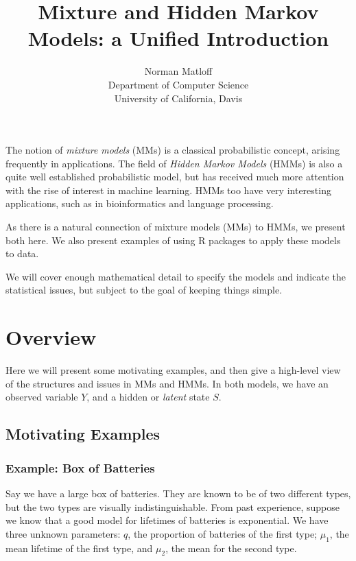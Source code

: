 \documentclass[11pt]{article}
\begin{document}
 

\title{Mixture and Hidden Markov Models: a Unified Introduction}
\author{Norman Matloff \\  
   Department of Computer Science \\
   University of California, Davis}

\maketitle

The notion of \textit{mixture models} (MMs)  is a classical
probabilistic concept, arising frequently in applications.  The field
of \textit{Hidden Markov Models} (HMMs) is also a quite well established
probabilistic model, but has received much more attention with the rise
of interest in machine learning.  HMMs too have very interesting
applications, such as in bioinformatics and language processing.

As there is a natural connection of mixture models (MMs) to HMMs, we
present both here.  We also present examples of using R packages to
apply these models to data.

We will cover enough mathematical detail to specify the models and
indicate the statistical issues, but subject to the goal of keeping
things simple.  

\section{Overview}

Here we will present some motivating examples, and then give a
high-level view of the structures and issues in MMs and HMMs.  In
both models, we have an observed variable $Y$, and a hidden or
\textit{latent} state $S$.

\subsection{Motivating Examples}

\subsubsection{Example:  Box of Batteries}

Say we have a large box of batteries.  They are known to be of two
different types, but the two types are visually indistinguishable.
From past experience, suppose we know that a good model for lifetimes of
batteries is exponential.  We have three unknown parameters: $q$, the
proportion of batteries of the first type; $\mu_1$, the mean lifetime of
the first type, and $\mu_2$, the mean for the second type.
\end{document}

